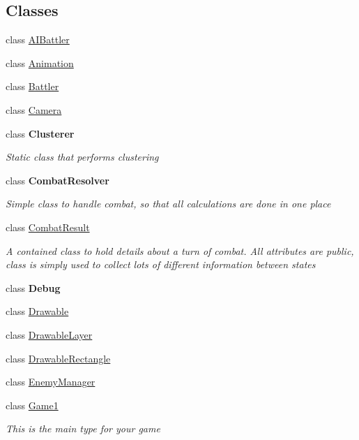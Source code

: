 \subsection*{Classes}
\begin{DoxyCompactItemize}
\item 
class \hyperlink{class_simple_r_p_g_1_1_a_i_battler}{A\-I\-Battler}
\item 
class \hyperlink{class_simple_r_p_g_1_1_animation}{Animation}
\item 
class \hyperlink{class_simple_r_p_g_1_1_battler}{Battler}
\item 
class \hyperlink{class_simple_r_p_g_1_1_camera}{Camera}
\item 
class {\bfseries Clusterer}
\begin{DoxyCompactList}\small\item\em Static class that performs clustering \end{DoxyCompactList}\item 
class {\bfseries Combat\-Resolver}
\begin{DoxyCompactList}\small\item\em Simple class to handle combat, so that all calculations are done in one place \end{DoxyCompactList}\item 
class \hyperlink{class_simple_r_p_g_1_1_combat_result}{Combat\-Result}
\begin{DoxyCompactList}\small\item\em A contained class to hold details about a turn of combat. All attributes are public, class is simply used to collect lots of different information between states \end{DoxyCompactList}\item 
class {\bfseries Debug}
\item 
class \hyperlink{class_simple_r_p_g_1_1_drawable}{Drawable}
\item 
class \hyperlink{class_simple_r_p_g_1_1_drawable_layer}{Drawable\-Layer}
\item 
class \hyperlink{class_simple_r_p_g_1_1_drawable_rectangle}{Drawable\-Rectangle}
\item 
class \hyperlink{class_simple_r_p_g_1_1_enemy_manager}{Enemy\-Manager}
\item 
class \hyperlink{class_simple_r_p_g_1_1_game1}{Game1}
\begin{DoxyCompactList}\small\item\em This is the main type for your game \end{DoxyCompactList}\item 

\end{DoxyCompactItemize}

